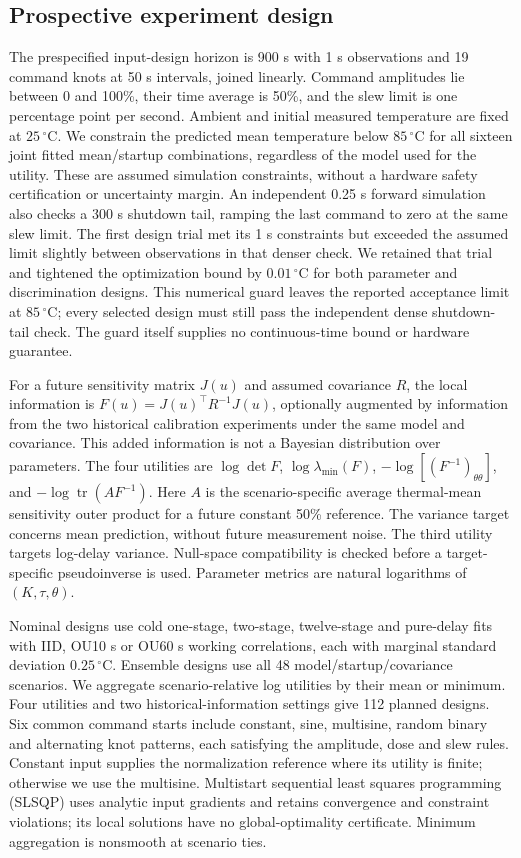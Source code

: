 \documentclass[11pt]{article}
\begin{document}
\subsection{Prospective experiment design}
The prespecified input-design horizon is 900 s with 1 s observations and 19
command knots at 50 s intervals, joined linearly. Command amplitudes lie between
0 and 100\%, their time average is 50\%, and the slew limit is one percentage
point per second. Ambient and initial measured temperature are fixed at
$25\,{}^\circ\mathrm C$. We constrain the predicted mean temperature below
$85\,{}^\circ\mathrm C$ for all sixteen joint fitted mean/startup combinations,
regardless of the model used for the utility. These are assumed simulation
constraints, without a hardware safety certification or uncertainty margin.
An independent 0.25 s forward simulation also checks a 300 s shutdown tail,
ramping the last command to zero at the same slew limit.
The first design trial met its 1 s constraints but exceeded the assumed limit
slightly between observations in that denser check. We retained that trial
and tightened the optimization bound by $0.01\,{}^\circ\mathrm C$ for both
parameter and discrimination designs. This numerical guard leaves the reported
acceptance limit at $85\,{}^\circ\mathrm C$; every selected design must still
pass the independent dense shutdown-tail check. The guard itself supplies no
continuous-time bound or hardware guarantee.

For a future sensitivity matrix $J(u)$ and assumed covariance $R$, the local
information is $F(u)=J(u)^\top R^{-1}J(u)$, optionally augmented by information
from the two historical calibration experiments under the same model and
covariance. This added information is not a Bayesian distribution over
parameters. The four utilities are $\log\det F$, $\log\lambda_{\min}(F)$,
$-\log[(F^{-1})_{\theta\theta}]$, and
$-\log\operatorname{tr}(A F^{-1})$. Here $A$ is the scenario-specific average
thermal-mean sensitivity outer product for a future constant 50\% reference.
The variance target concerns mean prediction, without future measurement noise.
The third utility targets log-delay variance.
Null-space compatibility is checked before a target-specific pseudoinverse is
used. Parameter metrics are natural logarithms of $(K,\tau,\theta)$.

Nominal designs use cold one-stage, two-stage, twelve-stage and pure-delay
fits with IID, OU10 s or OU60 s working correlations, each with marginal
standard deviation $0.25\,{}^\circ\mathrm C$. Ensemble designs use all 48
model/startup/covariance scenarios. We aggregate scenario-relative log utilities
by their mean or minimum. Four utilities and two historical-information settings
give 112 planned designs. Six common command starts include constant, sine,
multisine, random binary and alternating knot patterns, each satisfying the
amplitude, dose and slew rules. Constant input supplies the normalization
reference where its utility is finite; otherwise we use the multisine.
Multistart sequential least squares programming (SLSQP) uses
analytic input gradients and retains convergence and constraint violations;
its local solutions have no global-optimality certificate. Minimum aggregation
is nonsmooth at scenario ties.
\end{document}
